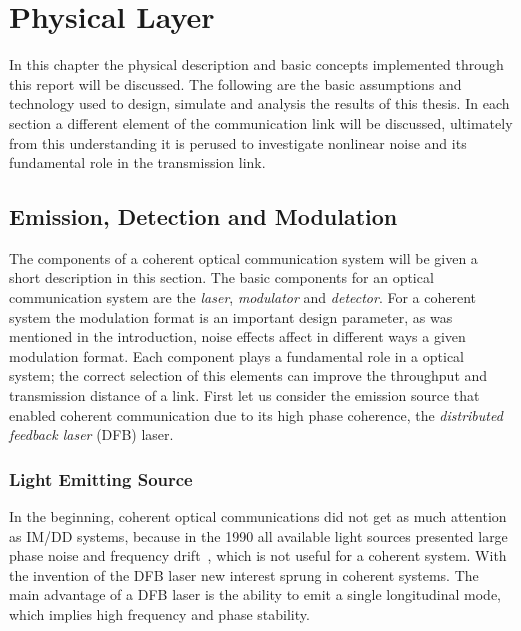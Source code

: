 \chapter{Physical Layer}\label{ch:Phsic}
In this chapter the physical description and basic concepts implemented through this report will be discussed. The following are the basic assumptions and technology used to design, simulate and analysis the results of this thesis. In each section a different element of the communication link will be discussed, ultimately from this understanding it is perused to investigate nonlinear noise and its fundamental role in the transmission link. 
\section{Emission, Detection and Modulation}
The components of a coherent optical communication system will be given a short description in this section. The basic components  for an optical communication system are the  \textit{laser}, \textit{modulator} and \textit{detector}. For a coherent system the modulation format is an important design parameter, as was mentioned in the introduction, noise effects affect in different ways a given modulation format. Each component plays a fundamental role in a optical system; the correct selection of this elements can improve the throughput and transmission distance of a link. First let us consider the emission source that enabled coherent communication due to its high phase coherence, the \textit{distributed feedback laser} (DFB) laser.  

\subsection{Light Emitting Source }

In the beginning, coherent optical communications  did not get as much attention as IM/DD systems, because in the 1990 all available  light sources presented large phase noise and frequency drift~\cite{kikuchi2010coherent}, which is not useful for a coherent system. With the invention of the DFB laser new interest sprung in coherent systems. The main advantage of a DFB laser is the ability to emit a single longitudinal mode, which implies high frequency and phase stability.
 
